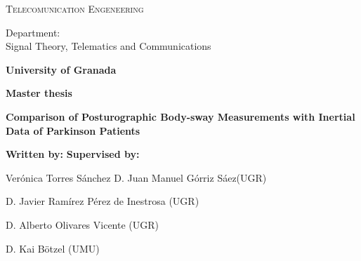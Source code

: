\begin{titlepage}
\label{ch:cover}
\begin{center}

{\Large\textsc{Telecomunication Engeneering}}


Department:  \\ Signal Theory, Telematics and Communications

\textbf{University of Granada}


\vspace{0.5cm}

\begin{figure}[h]
	\centering
	\label{fig:ugr}
\end{figure}


\vspace{0.5cm}
\textbf{Master thesis}


\vspace{0.9cm}


{\Huge\textbf{Comparison of Posturographic Body-sway Measurements with Inertial Data of Parkinson Patients }}


\end{center}


\vspace{1.5cm}
\textbf{Written by:}  \hfill \textbf{Supervised by:}

Ver\'onica Torres S\'anchez \hfill    D. Juan Manuel Górriz Sáez(UGR)

							\hfill	  D. Javier Ramírez Pérez de Inestrosa (UGR)
							
							\hfill    D. Alberto Olivares Vicente (UGR)
							
							\hfill	  D. Kai Bötzel (UMU)


\end{titlepage}
